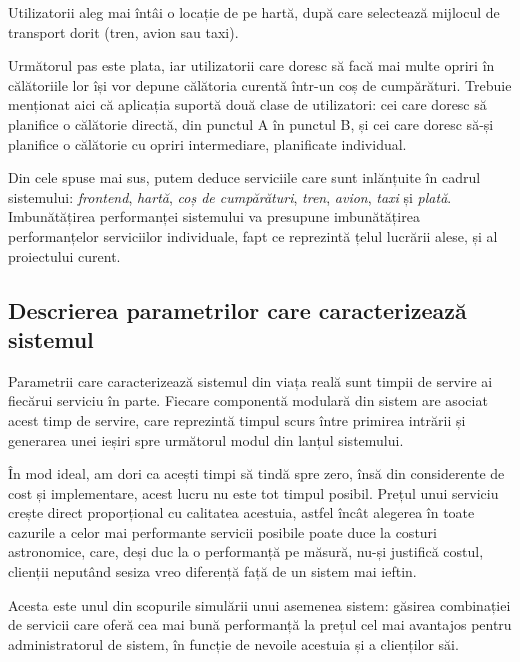 \documentclass[12pt]{article}
\begin{document}
            Utilizatorii aleg mai întâi o locație de pe hartă, după care selectează mijlocul de transport dorit (tren, avion sau taxi).

            Următorul pas este plata, iar utilizatorii care doresc să facă mai multe opriri în călătoriile lor își vor depune călătoria curentă într-un coș de cum\-pă\-ră\-turi. Trebuie menționat aici că aplicația suportă două clase de utilizatori: cei care doresc să planifice o călătorie directă, din punctul A în punctul B, și cei care doresc să-și planifice o călătorie cu opriri intermediare, planificate individual.

            Din cele spuse mai sus, putem deduce serviciile care sunt inlănțuite în cadrul sistemului: \textit{frontend}, \textit{hartă}, \textit{coș de cumpărături}, \textit{tren}, \textit{avion}, \textit{taxi} și \textit{plată}. Imbunătățirea performanței sistemului va presupune imbunătățirea performanțelor serviciilor individuale, fapt ce reprezintă țelul lucrării alese, și al proiectului curent.
            \pagebreak

        \subsection{Descrierea parametrilor care caracterizează sistemul}
            Parametrii care caracterizează sistemul din viața reală sunt timpii de servire ai fiecărui serviciu în parte. Fiecare componentă modulară din sistem are asociat acest timp de servire, care reprezintă timpul scurs între primirea intrării și generarea unei ieșiri spre următorul modul din lanțul sistemului.

            În mod ideal, am dori ca acești timpi să tindă spre zero, însă din considerente de cost și implementare, acest lucru nu este tot timpul posibil. Prețul unui serviciu crește direct proporțional cu calitatea acestuia, astfel încât alegerea în toate cazurile a celor mai performante servicii posibile poate duce la costuri astronomice, care, deși duc la o performanță pe măsură, nu-și justifică costul, clienții neputând sesiza vreo diferență față de un sistem mai ieftin.

            Acesta este unul din scopurile simulării unui asemenea sistem: găsirea combinației de servicii care oferă cea mai bună performanță la prețul cel mai avantajos pentru administratorul de sistem, în funcție de nevoile acestuia și a clienților săi.
\end{document}
